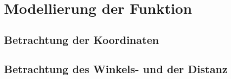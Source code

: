 \section{Modellierung der Funktion}
\label{mdf}

\subsection{Betrachtung der Koordinaten}
\label{bk}
\subsection{Betrachtung des Winkels- und der Distanz}
\label{bwd}